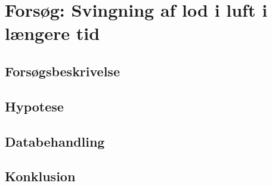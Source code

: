 \section{Forsøg: Svingning af lod i luft i længere tid}

\subsection{Forsøgsbeskrivelse}

\subsection{Hypotese}

\subsection{Databehandling}

\subsection{Konklusion}


